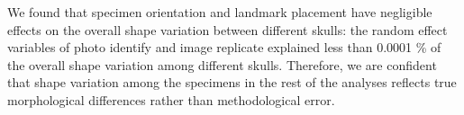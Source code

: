 \documentclass[12pt,a4paper]{article}
\begin{document}
	We found that specimen orientation and landmark placement have negligible effects on the overall shape variation between different skulls: the random effect variables of photo identify and image replicate explained less than 0.0001 \% of the overall shape variation among different skulls. Therefore, we are confident that shape variation among the specimens in the rest of the analyses reflects true morphological differences rather than methodological error.


 
 
\end{document}
